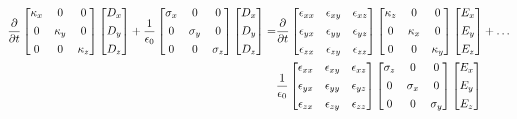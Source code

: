 \documentclass[]{article}
\begin{document}
		\begin{align}
			\pdv{}{t}\begin{bmatrix}
				\kappa_{x} & 0 & 0 \\[4pt]
				0 & \kappa_{y} & 0 \\[4pt] 
				0 & 0 & \kappa_{z}
			\end{bmatrix}
			\begin{bmatrix}
				D_{x} \\[4pt]
				D_{y} \\[4pt]
				D_{z} 
			\end{bmatrix} + 
			\frac{1}{\epsilon_{0}}\begin{bmatrix}
				\sigma_{x} & 0 & 0 \\[4pt]
				0 & \sigma_{y} & 0 \\[4pt] 
				0 & 0 & \sigma_{z}
			\end{bmatrix}
			\begin{bmatrix}
			D_{x} \\[4pt]
			D_{y} \\[4pt]
			D_{z} 
			\end{bmatrix} = &
			\pdv{}{t}
			\begin{bmatrix}
				\epsilon_{xx} & \epsilon_{xy} & \epsilon_{xz} \\[4pt]
				\epsilon_{yx} & \epsilon_{yy} & \epsilon_{yz} \\[4pt] 
				\epsilon_{zx} & \epsilon_{zy} & \epsilon_{zz}
			\end{bmatrix}
			\begin{bmatrix}
				\kappa_{z} & 0 & 0 \\[4pt]
				0 & \kappa_{x} & 0 \\[4pt] 
				0 & 0 & \kappa_{y}
			\end{bmatrix}
			\begin{bmatrix}
				E_{x} \\[4pt]
				E_{y} \\[4pt]
				E_{z} 
			\end{bmatrix} + \dots \\ &
			\frac{1}{\epsilon_{0}}			\begin{bmatrix}
				\epsilon_{xx} & \epsilon_{xy} & \epsilon_{xz} \\[4pt]
				\epsilon_{yx} & \epsilon_{yy} & \epsilon_{yz} \\[4pt] 
				\epsilon_{zx} & \epsilon_{zy} & \epsilon_{zz}
			\end{bmatrix}\begin{bmatrix}
				\sigma_{z} & 0 & 0 \\[4pt]
				0 & \sigma_{x} & 0 \\[4pt] 
				0 & 0 & \sigma_{y}
			\end{bmatrix}
			\begin{bmatrix}
				E_{x} \\[4pt]
				E_{y} \\[4pt]
				E_{z} 
			\end{bmatrix}
		\end{align}
		
\end{document}
